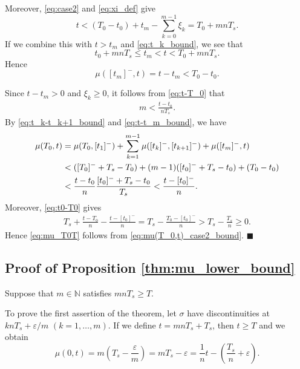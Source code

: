 \documentclass[a4, 11pt]{article}
\begin{document}
Moreover, \eqref{eq:case2} and \eqref{eq:xi_def} give
\begin{equation*}
t < (T_0 - t_0) + t_m -\sum_{k=0}^{m-1} \xi_{k}
= T_0 + mnT_s.
\end{equation*}
If we combine this with
$t > t_m$ and \eqref{eq:t_k_bound},
we see that
\begin{equation*}
t_0 + mnT_s \leq t_m < t < T_0 + mnT_s.
\end{equation*}
Hence 
\begin{equation}
\label{eq:t-t_m_bound}
\mu([t_m]^-,t) = t - t_m< T_0 - t_0.
\end{equation}

Since $t- t_m > 0$ and $\xi_k\geq 0$,
it follows from \eqref{eq:t-T_0} that
\begin{align*}
m < \frac{t-t_0}{nT_s}.
\end{align*}
By \eqref{eq:t_k-t_k+1_bound} and
\eqref{eq:t-t_m_bound}, we have
\begin{align}
\mu(T_0,t) 
&= \mu(T_0, [t_1]^-) + \sum_{k=1}^{m-1} \mu([t_k]^-,[t_{k+1}]^-)
+ \mu([t_m]^-,t) \notag \\ 
&< ([T_0]^-+T_s - T_0) + (m-1)([t_0]^-+T_s - t_0)+ (T_0 - t_0) \notag \\
&< \frac{t-t_0}{n}\frac{[t_0]^-+T_s - t_0}{T_s}
< \frac{t-[t_0]^-}{n}.
\label{eq:mu(T_0,t)_case2_bound}
\end{align}
Moreover, \eqref{eq:t0-T0} gives
\begin{align*}
T_s + \frac{t-T_0}{n}- \frac{t-[t_0]^-}{n}
= T_s - \frac{T_0 - [t_0]^-}{n} 
> T_s - \frac{T_s}{n} \geq 0.
\end{align*}
Hence 
\eqref{eq:mu_T0T} follows from \eqref{eq:mu(T_0,t)_case2_bound}.
\hfill $\blacksquare$





\subsection{Proof of Proposition \ref{thm:mu_lower_bound}}
Suppose that $m \in \mathbb{N}$ satisfies $mnT_s \geq T$.

To prove the first assertion of the theorem, let
$\sigma$ have discontinuities at $knT_s + \varepsilon/m$ $(k=1,\dots,m)$.
If we define
$t = mnT_s+T_s$, then $t \geq T$ and we obtain
\begin{equation*}
\mu(0,t) = m\left(T_s - \frac{\varepsilon}{m}\right) = mT_s -\varepsilon =
\frac{1}{n}t - \left( \frac{T_s}{n} + \varepsilon \right).
\end{equation*}
\end{document}
